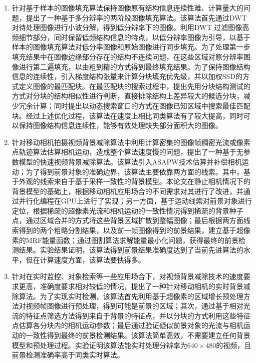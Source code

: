 \begin{enumerate}
  \item 针对基于样本的图像填充算法保持图像原有结构信息连续性难、计算量大的问题，提出了一种基于多分辨率的两阶段图像填充算法。该算法首先通过DWT对待处理图像进行小波分解，得到低分辨率下的图像。利用DWT 过滤图像高频细节部分，同时保留低频结构信息的特点，以低分辨率图像为引导，以基于样本的图像填充算法对低分率图像和原始图像进行同步填充。为了处理第一步填充结果中在图像边缘部分存在的结构不连续问题，在这些区域对原分辨率图像进行第二遍填充，以由粗到精的方式得到最终填充结果。为了保持图像结构信息的连续性，引入梯度结构张量来计算分块填充优先级，并以加权SSD的方式定义图像的最匹配块。在最匹配块的搜索过程中，提出先用分块结构测试的方式对分块的结构相似性进行判断，直接排除结构上差异较大的候选分块，减少冗余计算；同时提出以动态搜索窗口的方式在图像已知区域中搜索最佳匹配块。经过上述优化过程，该算法在速度上相比同类算法有了较大提高，同时可以保持图像结构信息连续性，能够有效处理缺失部分面积大的图像。
  \item 针对移动相机拍摄视频背景减除算法中利用计算密集的图像帧稠密光流或像素点轨迹算法估算相机运动，造成整个算法速度慢的问题，提出了一种基于无参数模型的快速视频背景减除算法。该算法引入ASAPW技术估算并补偿相机运动；为了得到前景对象的准确边界，该算法主要依靠两方面的线索。其中，基于外观的线索来自于基于采样一致性的背景模型。本论文在静止相机情况下的背景模型的基础上，根据移动相机应用场合的不同需求对其进行了改进，并通过并行化编程在GPU上进行了实现；另一方面，基于运动线索对前景对象进行定位，根据稀疏的超像素光流和相机运动的一致性情况得到稀疏的背景种子点，通过区域合并的方式将这些背景区域扩散到整幅图像；最后根据两方面线索得到的两个粗略分割结果，以及前一帧图像得到的前景结果，建立基于超像素的MRF能量函数；通过图割算法求解能量最小化问题，获得最终的前景检测结果。实验结果证明，该算法得到前景结果准确度达到了当前先进算法的水平，但在计算速度方面，该算法要快得多。
  \item 针对在实时监控、对象检索等一些应用场合下，对视频背景减除技术的速度要求更高，准确度要求相对较低的情况，提出了一种针对移动相机的实时背景减除算法。为了实现实时检测，该算法首先利用基于超像素的区域增长预处理方法对视频帧图像进行预处理，得到可能是前景的区域；其次，通过基于相对光流的特征点筛选方法得到来自于背景的特征点，并以分块的方式利用这些特征点估算各分块内的相机运动参数；最后通过验证疑似前景对象的光流与相机运动的一致性得到最终的前景检测结果。该算法简单高效，不需要建立任何背景模型和预处理过程。实验证明该算法能实时处理分辨率为$640 \times 480$的视频，且前景检测准确率高于同类实时算法。
\end{enumerate}


